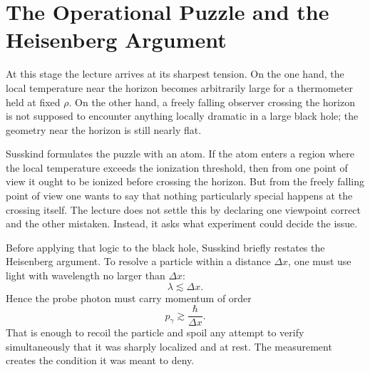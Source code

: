 \section{The Operational Puzzle and the Heisenberg Argument}

At this stage the lecture arrives at its sharpest tension. On the one hand, the local temperature near the horizon becomes arbitrarily large for a thermometer held at fixed \(\rho\). On the other hand, a freely falling observer crossing the horizon is not supposed to encounter anything locally dramatic in a large black hole; the geometry near the horizon is still nearly flat.

Susskind formulates the puzzle with an atom. If the atom enters a region where the local temperature exceeds the ionization threshold, then from one point of view it ought to be ionized before crossing the horizon. But from the freely falling point of view one wants to say that nothing particularly special happens at the crossing itself. The lecture does not settle this by declaring one viewpoint correct and the other mistaken. Instead, it asks what experiment could decide the issue.

Before applying that logic to the black hole, Susskind briefly restates the Heisenberg argument. To resolve a particle within a distance \(\Delta x\), one must use light with wavelength no larger than \(\Delta x\):
\begin{equation}
\lambda \lesssim \Delta x.
\end{equation}
Hence the probe photon must carry momentum of order
\begin{equation}
p_\gamma \gtrsim \frac{\hbar}{\Delta x}.
\end{equation}
That is enough to recoil the particle and spoil any attempt to verify simultaneously that it was sharply localized and at rest. The measurement creates the condition it was meant to deny.

